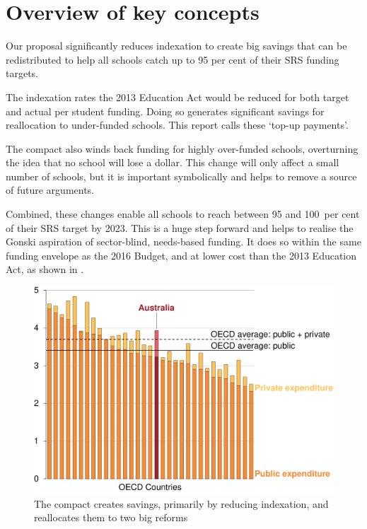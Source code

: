 \documentclass{grattan}
\begin{document}
\label{chap:part-a-achieving-needs-based-funding}

\section{Overview of key concepts}\label{sec:overview-of-key-concepts}

Our proposal significantly reduces indexation to create big savings that can be redistributed to help all schools catch up to 95 per cent of their SRS funding targets.

The indexation rates the 2013 Education Act would be reduced for both target and actual per student funding.
Doing so generates significant savings for reallocation to under-funded schools.
This report calls these `top-up payments'.

The compact also winds back funding for highly over-funded schools, overturning the idea that no school will lose a dollar.
This change will only affect a small number of schools, but it is important symbolically and helps to remove a source of future arguments.

Combined, these changes enable all schools to reach between 95 and 100~per cent of their SRS target by 2023.
This is a huge step forward and helps to realise the Gonski aspiration of sector-blind, needs\nobreakdash-based funding.
It does so within the same funding envelope as the 2016 Budget, and at lower cost than the 2013 Education Act, as shown in .%

\begin{figure}
\caption{The compact creates savings, primarily by reducing indexation, and reallocates them to two big reforms}\label{fig:most-savings-from-reducing-indexation}


\includegraphics[page=13]{atlas/Charts.pdf}

\end{figure}
\end{document}
